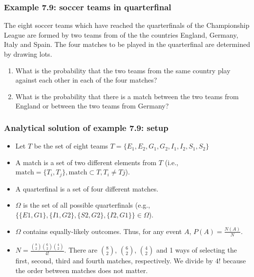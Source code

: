 \begin{frame}[fragile]
    \frametitle{Example 7.9: soccer teams in quarterfinal}

    \begin{manualProbExample}{7.9}
        The eight soccer teams which have reached the quarterfinals of the
        Championship League are formed by two teams from of the the countries
        England, Germany, Italy and Spain. The four matches to be played in the
        quarterfinal are determined by drawing lots.

        \begin{enumerate}[a]
            \item What is the probability that the two teams from the same
                country play against each other in each of the four matches?
            \item What is the probability that there is a match between the two
                teams from England or between the two teams from Germany?
        \end{enumerate}
    \end{manualProbExample}

\end{frame}

\begin{frame}
    \frametitle{Analytical solution of example 7.9: setup}
    \begin{itemize}[<+->]
        \item Let $T$ be the set of eight teams
            $T=\{E_1,E_2,G_1,G_2,I_1,I_2,S_1,S_2\}$
        \item A match is a set of two different elements from $T$ (i.e.,
            $\text{match}=\{T_i,T_j\},\text{match}\subset T,T_i\neq Tj$).
        \item A quarterfinal is a set of four different matches.
        \item $\Omega$ is the set of all possible quarterfinals (e.g.,
            $\{\{E1,G1\},\{I1,G2\},\{S2,G2\},\{I2,G1\}\}\in\Omega$).
        \item $\Omega$ contains equally-likely outcomes. Thus, for any event
            $A$, $P(A)=\frac{N(A)}{N}$.

        \item $N=\frac{\binom{8}{2}\binom{6}{2}\binom{4}{2}}{4!}$. There are
            $\binom{8}{2}$, $\binom{6}{2}$, $\binom{4}{2}$ and 1  ways of
            selecting the first, second, third and fourth matches,
            respectively. We divide by $4!$ because the order between matches
            does not matter.

    \end{itemize}
\end{frame}

